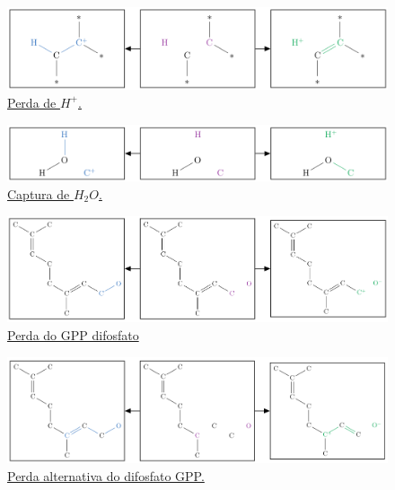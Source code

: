 \begin{figure}[H]
	\centering
\includegraphics[width=.925\textwidth]{images/r2.png}
\caption{\href{https://github.com/waldeyr/2PathTerpenes/blob/master/rules/h_loss.gml}{Perda de $H^+$.}}
\label{figRule2}
\end{figure}

\begin{figure}[H]
	\centering
	\includegraphics[width=.925\textwidth]{images/r3.png}
	\caption{\href{https://github.com/waldeyr/2PathTerpenes/blob/master/rules/h2o_gain.gml}{Captura de $H_2O$.}}
	\label{figRule3}
\end{figure}


\begin{figure}[H]
	\centering
	\includegraphics[width=.925\textwidth]{images/r4.png}
	\caption{\href{https://github.com/waldeyr/2PathTerpenes/blob/master/rules/opp_loss_gpp.gml}{Perda do GPP difosfato}}
	\label{figRule4}
\end{figure}

\begin{figure}[H]
	\centering
	\includegraphics[width=.925\textwidth]{images/r5.png}
	\caption{\href{https://github.com/waldeyr/2PathTerpenes/blob/master/rules/opp_loss_gpp_alternative.gml}{Perda alternativa do difosfato GPP.}}
	\label{figRule5}
\end{figure}

